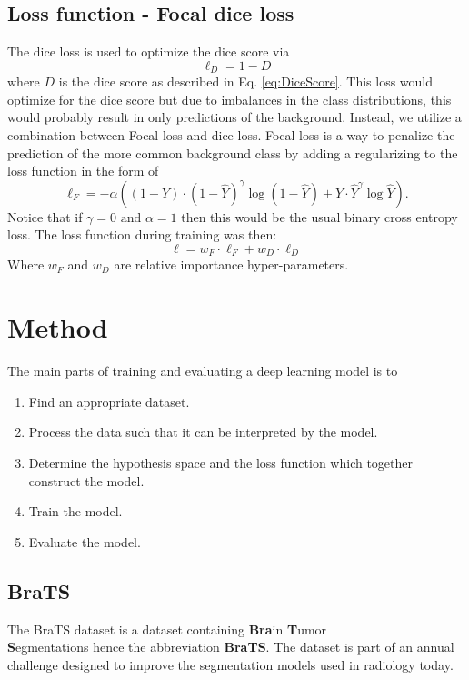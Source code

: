 \documentclass[fleqn,10pt]{SelfArx} %
\begin{document}
\subsection{Loss function - Focal dice loss}
The dice loss is used to optimize the dice score via 
\begin{equation}
\label{eq:DiceLoss}
    \ell_D = 1 - D
\end{equation}
where $D$ is the dice score as described in Eq. \ref{eq:DiceScore}. This loss would optimize for the dice score but due to imbalances in the class distributions, this would probably result in only predictions of the background. Instead, we utilize a combination between Focal loss and dice loss. Focal loss is a way to penalize the prediction of the more common background class by adding a regularizing to the loss function in the form of
\begin{equation}
\label{eq:Focal}
    \ell_{F} = -\alpha\left((1-Y)\cdot(1-\hat{Y})^\gamma\log\left(1-\hat{Y}\right)+Y\cdot\hat{Y}^\gamma\log\hat{Y}\right).
\end{equation}
Notice that if $\gamma=0 \text{ and } \alpha=1$ then this would be the usual binary cross entropy loss.\cite{Focal} The loss function during training was then:
\begin{equation}
    \label{eq:loss}
    \ell = w_F\cdot\ell_F + w_D\cdot\ell_D
\end{equation}
Where $w_F$ and $w_D$ are relative importance hyper-parameters.
\section{Method}
The main parts of training and evaluating a deep learning model is to 
\begin{enumerate}
  \setlength{\itemsep}{5pt}
  \setlength{\parskip}{5pt}
    \item Find an appropriate dataset.
    \item Process the data such that it can be interpreted by the model.
    \item Determine the hypothesis space and the loss function which together construct the model.
    \item Train the model.
    \item Evaluate the model.
\end{enumerate}
\subsection{BraTS}
The BraTS dataset is a dataset containing \textbf{Bra}in \textbf{T}umor \\\textbf{S}egmentations hence the abbreviation \textbf{BraTS}. The dataset is part of an annual challenge designed to improve the segmentation models used in radiology today.\cite{brats}
\end{document}
